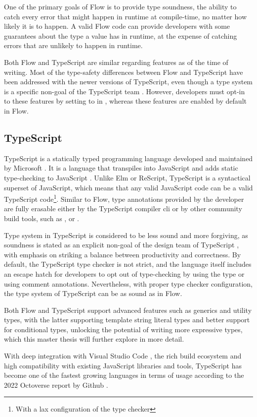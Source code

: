 One of the primary goals of Flow is to provide type soundness, the ability to catch every error that might happen in runtime at compile-time, no matter how likely it is to happen. A valid Flow code can provide developers with some guarantees about the type a value has in runtime, at the expense of catching errors that are unlikely to happen in runtime.

Both Flow and TypeScript are similar regarding features as of the time of writing. Most of the type-safety differences between Flow and TypeScript have been addressed with the newer versions of TypeScript, even though a  type system is a specific non-goal of the TypeScript team \cite{TypeScriptDesignGoals}. However, developers must opt-in to these features by setting  to  in , whereas these features are enabled by default in Flow.

\subsection{TypeScript}

TypeScript is a statically typed programming language developed and maintained by Microsoft \cite{TypeScriptJavaScriptSyntax}. It is a language that transpiles into JavaScript and adds static type-checking to JavaScript \cite{DocumentationTypeScriptJavaScript}. Unlike Elm or ReScript, TypeScript is a syntactical superset of JavaScript, which means that any valid JavaScript code can be a valid TypeScript code\footnote{With a lax configuration of the type checker}. Similar to Flow, type annotations provided by the developer are fully erasable either by the TypeScript compiler \acrshort{cli} or by other community build tools, such as  \cite{BabelBabel2023},  \cite{EsbuildExtremelyFast} or  \cite{SWCRustbasedPlatform}.

Type system in TypeScript is considered to be less sound and more forgiving, as soundness is stated as an explicit non-goal of the design team of TypeScript \cite{TypeScriptDesignGoals}, with emphasis on striking a balance between productivity and correctness. By default, the TypeScript type checker is not strict, and the language itself includes an escape hatch for developers to opt out of type-checking by using the  type or using  comment annotations. Nevertheless, with proper type checker configuration, the type system of TypeScript can be as sound as in Flow.

Both Flow and TypeScript support advanced features such as generics and utility types, with the latter supporting template string literal types and better support for conditional types, unlocking the potential of writing more expressive types, which this master thesis will further explore in more detail.

With deep integration with Visual Studio Code \cite{VisualStudioCode}, the rich build ecosystem and high compatibility with existing JavaScript libraries and tools, TypeScript has become one of the fastest growing languages in terms of usage according to the 2022 Octoverse report by Github \cite{Octoverse2022State}.
